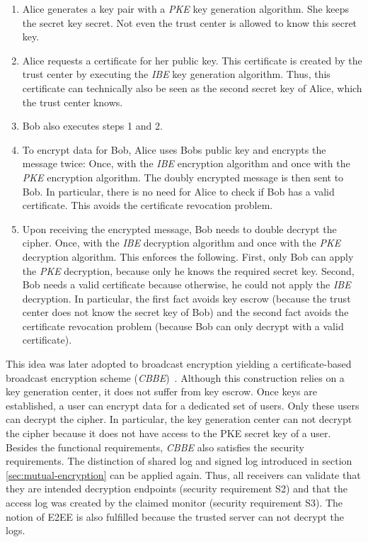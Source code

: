 \documentclass[../main.tex]{subfiles}
\begin{document}
\begin{enumerate}
    \item Alice generates a key pair with a \textit{PKE} key generation algorithm. She keeps the secret key secret. 
    Not even the trust center is allowed to know this secret key.
    \item Alice requests a certificate for her public key. 
    This certificate is created by the trust center by executing the \textit{IBE} key generation algorithm. 
    Thus, this certificate can technically also be seen as the second secret key of Alice, which the trust center knows.
    \item Bob also executes steps 1 and 2.
    \item To encrypt data for Bob, Alice uses Bobs public key and encrypts the message twice: Once, with the \textit{IBE} encryption algorithm and once with the \textit{PKE} encryption algorithm. The doubly encrypted message is then sent to Bob. In particular, there is no need for Alice to check if Bob has a valid certificate. This avoids the certificate revocation problem.
    \item Upon receiving the encrypted message, Bob needs to double decrypt the cipher. 
    Once, with the \textit{IBE} decryption algorithm and once with the \textit{PKE} decryption algorithm. 
    This enforces the following.
    First, only Bob can apply the \textit{PKE} decryption, because only he knows the required secret key. 
    Second, Bob needs a valid certificate because otherwise, he could not apply the \textit{IBE} decryption. 
    In particular, the first fact avoids key escrow (because the trust center does not know the secret key of Bob) and the second fact avoids the certificate revocation problem (because Bob can only decrypt with a valid certificate).
\end{enumerate}
This idea was later adopted to broadcast encryption yielding a certificate-based broadcast encryption scheme (\textit{CBBE})~\cite{Li2018}.
Although this construction relies on a key generation center, it does not suffer from key escrow.
Once keys are established, a user can encrypt data for a dedicated set of users.
Only these users can decrypt the cipher.
In particular, the key generation center can not decrypt the cipher because it does not have access to the PKE secret key of a user.
Besides the functional requirements, \textit{CBBE} also satisfies the security requirements.
The distinction of shared log and signed log introduced in section \ref{sec:mutual-encryption} can be applied again.
Thus, all receivers can validate that they are intended decryption endpoints (security requirement S2) and that the access log was created by the claimed monitor (security requirement S3).
The notion of E2EE is also fulfilled because the trusted server can not decrypt the logs.
\end{document}
